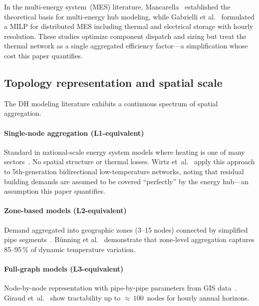 \documentclass[review,3p]{elsarticle}
\begin{document}
In the multi-energy system~(MES) literature,
Mancarella~\cite{Mancarella2014} established the theoretical basis for
multi-energy hub modeling, while Gabrielli et
al.~\cite{Gabrielli2018} formulated a MILP for distributed MES
including thermal and electrical storage with hourly resolution. These
studies optimize component dispatch and sizing but treat the thermal
network as a single aggregated efficiency factor---a simplification
whose cost this paper quantifies.

\subsection{Topology representation and spatial scale}
\label{sec:rw_topology}

The DH modeling literature exhibits a continuous spectrum of spatial
aggregation.

\paragraph{Single-node aggregation (L1-equivalent)}
Standard in national-scale energy system models where heating is one
of many sectors~\cite{Connolly2014_EnergyPLAN,Brown2018_pypsa,
Lund2017_SmartEnergy}. No spatial structure or thermal losses. Wirtz
et~al.~\cite{Wirtz2020} apply this approach to 5th-generation
bidirectional low-temperature networks, noting that residual building
demands are assumed to be covered ``perfectly'' by the energy
hub---an assumption this paper quantifies.

\paragraph{Zone-based models (L2-equivalent)}
Demand aggregated into geographic zones (3--15 nodes) connected by
simplified pipe
segments~\cite{Wirtz2020,Mertz2016,Buffa2019}. Bünning et
al.~\cite{Buenning2020} demonstrate that zone-level aggregation
captures 85--95\,\% of dynamic temperature variation.

\paragraph{Full-graph models (L3-equivalent)}
Node-by-node representation with pipe-by-pipe parameters from GIS
data~\cite{Vesterlund2017,Schweiger2017,vanderHeijde2017,
Blommaert2020}. Giraud et~al.~\cite{Giraud2015} show tractability up
to ${\approx}\,100$~nodes for hourly annual horizons.
\end{document}
